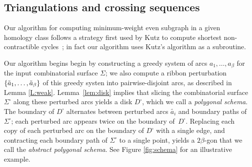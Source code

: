 \documentclass[letterpaper,review]{siamart190516}
\begin{document}
\subsection{Triangulations and crossing sequences}
\label{SS:homotopy-triangulation}

Our algorithm for computing minimum-weight even subgraph in a given homology class follows a strategy first used by Kutz to compute shortest non-contractible cycles~\cite{k-csnco-06}; in fact our algorithm uses Kutz’s algorithm as a subroutine.

Our algorithm begins begin by constructing a greedy system of arcs $a_1, \dots, a_\beta$ for the input combinatorial surface $\Sigma$; we also compute a ribbon perturbation $\{ \tilde{a}_1, \dots, \tilde{a}_\beta \}$ of this greedy systen into pairwise-disjoint arcs, as described in Lemma \ref{L:weak}.  Lemma~\ref{lem:disk} implies that slicing the combinatorial surface $\Sigma^\square$ along these perturbed arcs yields a disk $D^\square$, which we call a \emph{polygonal schema}.  The boundary of $D^\square$ alternates between perturbed arcs $\tilde{a_i}$ and boundary paths of $\Sigma^\square$; each perturbed arc appears twice on the boundary of~$D^\square$.  Replacing each copy of each perturbed arc on the boundary of $D^\square$ with a single edge, and contracting each boundary path of $\Sigma^\square$ to a single point, yields a $2\beta$-gon that we call the \emph{abstract polygonal schema}.  See Figure \ref{fig:schema} for an illustrative example.
\end{document}

